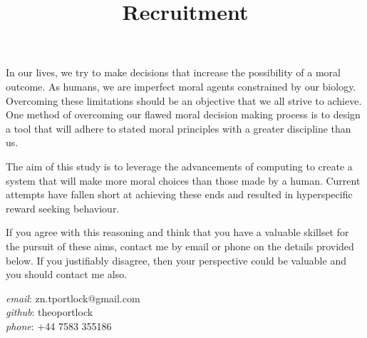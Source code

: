 \documentclass[12pt]{article}
\title{Recruitment}
\date{\vspace{-5ex}}
\begin{document}
\maketitle

In our lives, we try to make decisions that increase the possibility of a moral outcome.
As humans, we are imperfect moral agents constrained by our biology.
Overcoming these limitations should be an objective that we all strive to achieve.
One method of overcoming our flawed moral decision making process is to design a tool that will adhere to stated moral principles with a greater discipline than us.

\vspace{5mm}
\noindent
The aim of this study is to leverage the advancements of computing to create a system that will make more moral choices than those made by a human.
Current attempts have fallen short at achieving these ends and resulted in hyperspecific reward seeking behaviour.

\vspace{5mm}
\noindent
If you agree with this reasoning and think that you have a valuable skillset for the pursuit of these aims, contact me by email or phone on the details provided below.
If you justifiably disagree, then your perspective could be valuable and you should contact me also.

\vspace{5mm}
\noindent
\emph{email}:	zn.tportlock@gmail.com \\
\emph{github}:	theoportlock \\
\emph{phone}:	+44 7583 355186
\end{document}
